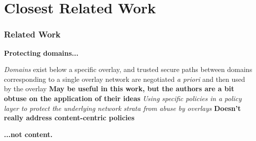 \section{Closest Related Work}
\begin{frame}
\frametitle{Related Work}
\begin{beamerboxesrounded}[shadow]{}
\textbf{Protecting domains...}
\end{beamerboxesrounded}
\textit{Domains} exist below a specific overlay, and trusted secure paths between domains corresponding to a single overlay network are negotiated \textit{a priori} and then used by the overlay \cite{4457175}
\newline
\newline
\textbf{May be useful in this work, but the authors are a bit obtuse on the application of their ideas}
\newline
\newline
\textit{Using specific policies in a policy layer to protect the underlying network strata from abuse by overlays \cite{foo}}
\newline
\newline
\textbf{Doesn't really address content-centric policies}
\newline
\newline
\begin{beamerboxesrounded}[shadow]{}
\textbf{...not content.}
\end{beamerboxesrounded}
\end{frame}
